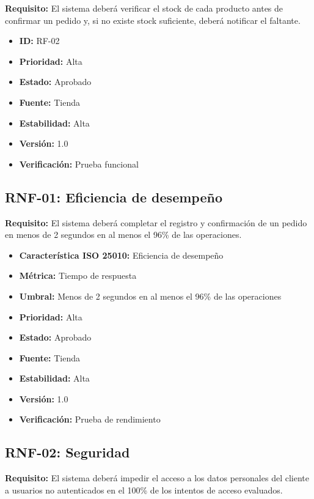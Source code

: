 \documentclass[12pt]{article}
\begin{document}
\textbf{Requisito:} El sistema deberá verificar el stock de cada
producto antes de confirmar un pedido y, si no existe stock suficiente,
deberá notificar el faltante.

\begin{itemize}
    \item \textbf{ID:} RF-02
    \item \textbf{Prioridad:} Alta
    \item \textbf{Estado:} Aprobado
    \item \textbf{Fuente:} Tienda
    \item \textbf{Estabilidad:} Alta
    \item \textbf{Versión:} 1.0
    \item \textbf{Verificación:} Prueba funcional
\end{itemize}

\subsection*{RNF-01: Eficiencia de desempeño}

\textbf{Requisito:} El sistema deberá completar el registro y
confirmación de un pedido en menos de 2 segundos en al menos el
96\% de las operaciones.

\begin{itemize}
    \item \textbf{Característica ISO 25010:} Eficiencia de desempeño
    \item \textbf{Métrica:} Tiempo de respuesta
    \item \textbf{Umbral:} Menos de 2 segundos en al menos el 96\% de las operaciones
    \item \textbf{Prioridad:} Alta
    \item \textbf{Estado:} Aprobado
    \item \textbf{Fuente:} Tienda
    \item \textbf{Estabilidad:} Alta
    \item \textbf{Versión:} 1.0
    \item \textbf{Verificación:} Prueba de rendimiento
\end{itemize}

\subsection*{RNF-02: Seguridad}

\textbf{Requisito:} El sistema deberá impedir el acceso a los datos
personales del cliente a usuarios no autenticados en el 100\% de los
intentos de acceso evaluados.
\end{document}
